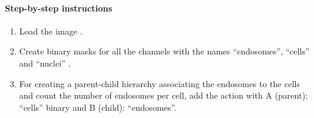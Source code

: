 \paragraph{Step-by-step instructions}

\begin{enumerate}
    \item Load the image .

    \item Create binary masks for all the channels with the names ``endosomes'', ``cells'' and ``nuclei'' 
    . 

    \item For creating a parent-child hierarchy associating the endosomes to the cells and count the number of endosomes per cell, add the action  with A (parent): ``cells'' binary and B (child): ``endosomes''. 




\end{enumerate}
